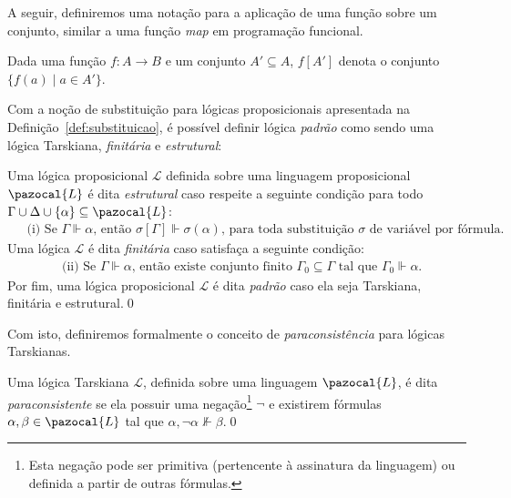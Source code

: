     A seguir, definiremos uma notação para a aplicação de uma função sobre um conjunto, similar a uma função \textit{map} em programação funcional.
    \begin{notacao}
        Dada uma função $f : A \to B$ e um conjunto $A' \subseteq A$, $f[A']$ denota o conjunto $\{f(a) \; | \; a \in A'\}$.
    \end{notacao}
    
    Com a noção de substituição para lógicas proposicionais apresentada na Definição~\ref{def:substituicao}, é possível definir lógica \textit{padrão} como sendo uma lógica Tarskiana, \textit{finitária} e \textit{estrutural}:
    
    \begin{definicao}\label{def:padrao}
        Uma lógica proposicional $\mathcal{L}$ definida sobre uma linguagem proposicional $\pazocal{L}$ é dita \textit{estrutural} caso respeite a seguinte condição para todo $\Gamma \cup \Delta \cup \{\alpha\} \subseteq \pazocal{L}$:
        \begin{align*}
            & \text{~(i) Se } \Gamma \Vdash \alpha \text{, então } \sigma [\Gamma] \Vdash \sigma(\alpha) \text{, para toda substituição } \sigma \text{ de variável por fórmula.}
        \end{align*}
        Uma lógica $\mathcal{L}$ é dita \textit{finitária} caso satisfaça a seguinte condição:
        \begin{align*}
            & \text{(ii) Se } \Gamma \Vdash \alpha \text{, então existe conjunto finito } \Gamma_{0} \subseteq \Gamma \text{ tal que } \Gamma_{0} \Vdash \alpha.
        \end{align*}
        Por fim, uma lógica proposicional $\mathcal{L}$ é dita \textit{padrão} caso ela seja Tarskiana, finitária e estrutural.\qed{}
    
    \end{definicao}

    Com isto, definiremos formalmente o conceito de \textit{paraconsistência} para lógicas Tarskianas.

    \begin{definicao}\label{def:Tarskiana_paracons}
        Uma lógica Tarskiana $\mathcal{L}$, definida sobre uma linguagem $\pazocal{L}$, é dita \textit{paraconsistente} se ela possuir uma negação\footnote{Esta negação pode ser primitiva (pertencente à assinatura da linguagem) ou definida a partir de outras fórmulas.} $\neg$ e existirem fórmulas $\alpha, \beta \in \pazocal{L}$ tal que $\alpha, \neg \alpha \nVdash \beta$.\qed{}
    \end{definicao}

